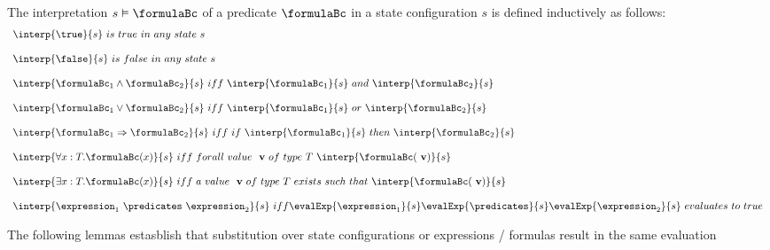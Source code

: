 \begin{interpPred} \label{interpPred} 
The interpretation $ s \vDash \formulaBc$ of a predicate $\formulaBc$ in a state configuration $s$ is defined inductively as follows:
$$
\begin{array}{l}
\interp{\true}{s} \  is \ true \ in \ any \ state \ s \\
\\
\interp{\false}{s} \ is \ false \ in \ any \ state \ s \\
\\

\interp{\formulaBc_1  \wedge  \formulaBc_2 }{s} \ iff \ \interp{\formulaBc_1}{s} \ and \ \interp{\formulaBc_2}{s}  \\
\\

\interp{\formulaBc_1  \vee  \formulaBc_2 }{s} \ iff \ \interp{\formulaBc_1}{s} \ or \ \interp{\formulaBc_2}{s}  \\
\\
\interp{\formulaBc_1  \Rightarrow  \formulaBc_2 }{s} \ iff \ if \ \interp{\formulaBc_1}{s} \ then \ \interp{\formulaBc_2}{s}  \\
\\
\interp{\forall x : T .  \formulaBc(x)   }{s} \ iff \ forall \ value \ \mbox{ \rm \textbf{v}} \ of \  type \  T \ \interp{\formulaBc(\mbox{ \rm \textbf{v}})}{s}  \\
\\

\interp{\exists x : T .  \formulaBc(x)   }{s} \ iff \ a \ value \ \mbox{ \rm \textbf{v}} \ of \  type \  T \ exists \ such \ that \ \interp{\formulaBc(\mbox{ \rm \textbf{v}})}{s}  \\
\\
\interp{\expression_1 \  \predicates \  \expression_2 }{s} \ iff \evalExp{\expression_1 }{s} \evalExp{\predicates }{s}  \evalExp{\expression_2 }{s} \ evaluates \ to \ true
\end{array}
$$   
\end{interpPred}


The following lemmas estasblish that substitution over state configurations or expressions / formulas result in the same evaluation

